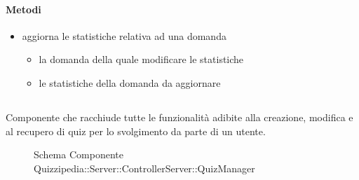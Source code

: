 \paragraph{Metodi}
\begin{itemize}
\item {}
\newline
aggiorna le statistiche relativa ad una domanda
\newline
{}
\newline
\begin{itemize}
\item {}
\newline
la domanda della quale modificare le statistiche
\item {}
\newline
le statistiche della domanda da aggiornare
\end{itemize}
\end{itemize}
\subsection{}
Componente che racchiude tutte le funzionalità adibite alla creazione, modifica e al recupero di quiz per lo svolgimento da parte di un utente.
\begin{figure}[H]
\centering
\noindent{}
\caption[Schema Componente Quizzipedia::Server::ControllerServer::QuizManager]{Schema Componente Quizzipedia::Server::ControllerServer::QuizManager}
\end{figure}

